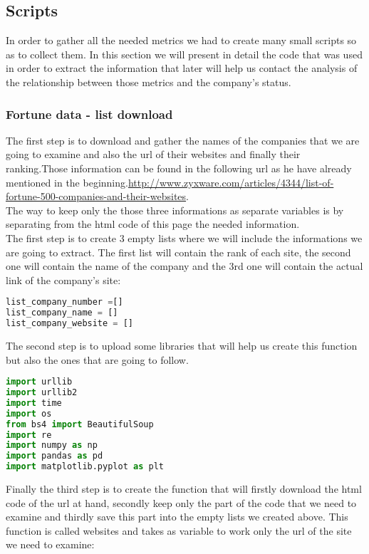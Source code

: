 \documentclass{article}
\begin{document}
\subsection{Scripts}
In order to gather all the needed metrics we had to create many small scripts so as to collect them. In this section we will present in detail the code that was used in order to extract the information that later will help us contact the analysis of the relationship between those metrics and the company's status.
\subsubsection{Fortune data - list download}
The first step is to download and gather the names of the companies that we are going to examine and also the url of their websites and finally their ranking.Those information can be found in the following url as he have already mentioned in the beginning.\href{url}{http://www.zyxware.com/articles/4344/list-of-fortune-500-companies-and-their-websites}.\\
The way to keep only the those three informations as separate variables is by separating from the html code of this page the needed information.\\
The first step is to create 3 empty lists where we will include the informations we are going to extract. The first list will contain the rank of each site, the second one will contain the name of the company and the 3rd one will contain the actual link of the company's site:
\begin{lstlisting}[language=Python]
list_company_number =[]
list_company_name = []
list_company_website = []
\end{lstlisting}
The second step is to upload some libraries that will help us create this function but also the ones that are going to follow.
\begin{lstlisting}[language=Python]
import urllib
import urllib2
import time
import os
from bs4 import BeautifulSoup
import re
import numpy as np
import pandas as pd
import matplotlib.pyplot as plt
\end{lstlisting}
Finally the third step is to create the function that will firstly download the html code of the url at hand, secondly keep only the part of the code that we need to examine and thirdly save this part into the empty lists we created above. This function is called websites and takes as variable to work only the url of the site we need to examine: 
\end{document}
